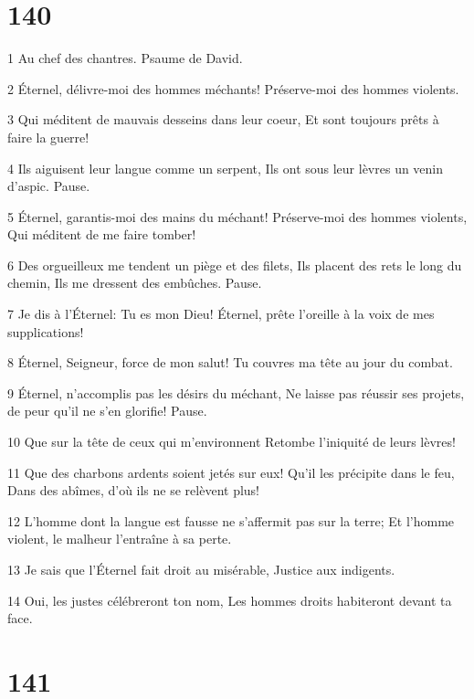 \chapter{140}

\par 1 Au chef des chantres. Psaume de David.
\par 2 Éternel, délivre-moi des hommes méchants! Préserve-moi des hommes violents.
\par 3 Qui méditent de mauvais desseins dans leur coeur, Et sont toujours prêts à faire la guerre!
\par 4 Ils aiguisent leur langue comme un serpent, Ils ont sous leur lèvres un venin d'aspic. Pause.
\par 5 Éternel, garantis-moi des mains du méchant! Préserve-moi des hommes violents, Qui méditent de me faire tomber!
\par 6 Des orgueilleux me tendent un piège et des filets, Ils placent des rets le long du chemin, Ils me dressent des embûches. Pause.
\par 7 Je dis à l'Éternel: Tu es mon Dieu! Éternel, prête l'oreille à la voix de mes supplications!
\par 8 Éternel, Seigneur, force de mon salut! Tu couvres ma tête au jour du combat.
\par 9 Éternel, n'accomplis pas les désirs du méchant, Ne laisse pas réussir ses projets, de peur qu'il ne s'en glorifie! Pause.
\par 10 Que sur la tête de ceux qui m'environnent Retombe l'iniquité de leurs lèvres!
\par 11 Que des charbons ardents soient jetés sur eux! Qu'il les précipite dans le feu, Dans des abîmes, d'où ils ne se relèvent plus!
\par 12 L'homme dont la langue est fausse ne s'affermit pas sur la terre; Et l'homme violent, le malheur l'entraîne à sa perte.
\par 13 Je sais que l'Éternel fait droit au misérable, Justice aux indigents.
\par 14 Oui, les justes célébreront ton nom, Les hommes droits habiteront devant ta face.

\chapter{141}

